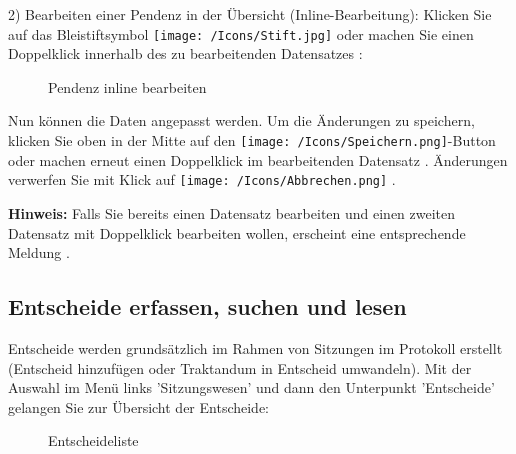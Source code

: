 2) Bearbeiten einer Pendenz in der Übersicht (Inline-Bearbeitung): Klicken Sie auf das Bleistiftsymbol \texttt{[image: /Icons/Stift.jpg]}  oder machen Sie einen Doppelklick innerhalb des zu bearbeitenden Datensatzes :

\begin{figure}[H]
\caption{Pendenz inline bearbeiten}
\end{figure}

Nun können die Daten angepasst werden. Um die Änderungen zu speichern, klicken Sie oben in der Mitte auf den \texttt{[image: /Icons/Speichern.png]}-Button  oder machen erneut einen Doppelklick im bearbeitenden Datensatz . Änderungen verwerfen Sie mit Klick auf \texttt{[image: /Icons/Abbrechen.png]} .

\vspace{\baselineskip}

\textbf{Hinweis:} Falls Sie bereits einen Datensatz bearbeiten und einen zweiten Datensatz mit Doppelklick bearbeiten wollen, erscheint eine entsprechende Meldung . 

\subsection{Entscheide erfassen, suchen und lesen}

Entscheide werden grundsätzlich im Rahmen von Sitzungen im Protokoll erstellt (Entscheid hinzufügen oder Traktandum in Entscheid umwandeln). 
Mit der Auswahl im Menü links 'Sitzungswesen' und dann den Unterpunkt 'Entscheide' gelangen Sie zur Übersicht der Entscheide:

\begin{figure}[H]
\caption{Entscheideliste}
\end{figure}

